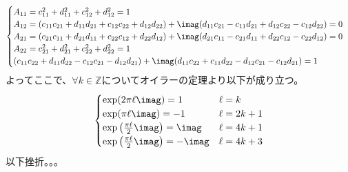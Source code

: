 \begin{itemize}
\begin{align*}
\begin{cases}
            A_{11} = c_{11}^{2} + d_{11}^{2} + c_{12}^{2} + d_{12}^{2} = 1\\
            A_{12} = (c_{11}c_{21} + d_{11}d_{21} + c_{12}c_{22} + d_{12}d_{22}) + \imag (d_{11}c_{21} -  c_{11}d_{21} + d_{12}c_{22} - c_{12}d_{22}) = 0\\
            A_{21} = (c_{21}c_{11} + d_{21}d_{11} + c_{22}c_{12} + d_{22}d_{12}) + \imag(d_{21}c_{11} - c_{21}d_{11} + d_{22}c_{12} - c_{22}d_{12}) = 0\\
            A_{22} = c_{21}^{2} + d_{21}^{2} + c_{22}^{2} + d_{22}^{2} = 1\\
            (c_{11}c_{22} + d_{11}d_{22} - c_{12}c_{21} - d_{12}d_{21}) + \imag (d_{11}c_{22} + c_{11}d_{22} - d_{12}c_{21} - c_{12}d_{21}) = 1
        \end{cases}
    \end{align*}
    よってここで、$\forall k \in \mathbb{Z}$についてオイラーの定理より以下が成り立つ。
    \begin{align*}
        \begin{cases}
            \exp(2\pi\ell\imag) = 1 & \ell = k\\
            \exp(\pi\ell\imag) = -1 & \ell = 2k + 1\\
            \exp\left(\frac{\pi\ell}{2}\imag\right)  = \imag & \ell = 4k + 1\\
            \exp\left(\frac{\pi\ell}{2}\imag\right)  = -\imag & \ell = 4k + 3\\
        \end{cases}
    \end{align*}
    以下挫折。。。
\end{itemize}